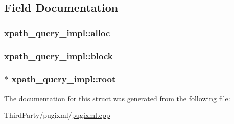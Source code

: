 \subsection{Field Documentation}
\hypertarget{structxpath__query__impl_ae568b8642d48e729f2ccc2a50467c847}{
\subsubsection[{alloc}]{ xpath\-\_\-query\-\_\-impl\-::alloc}}\label{structxpath__query__impl_ae568b8642d48e729f2ccc2a50467c847}
\hypertarget{structxpath__query__impl_a3a8af3ceed6a504567656ec6d1b62641}{
\subsubsection[{block}]{ xpath\-\_\-query\-\_\-impl\-::block}}\label{structxpath__query__impl_a3a8af3ceed6a504567656ec6d1b62641}
\hypertarget{structxpath__query__impl_ad25499e0c8391005e3a1a60633d631fe}{
\subsubsection[{root}]{$\ast$ xpath\-\_\-query\-\_\-impl\-::root}}\label{structxpath__query__impl_ad25499e0c8391005e3a1a60633d631fe}


The documentation for this struct was generated from the following file\-:\begin{DoxyCompactItemize}
\item 
Third\-Party/pugixml/\hyperlink{pugixml_8cpp}{pugixml.\-cpp}\end{DoxyCompactItemize}
